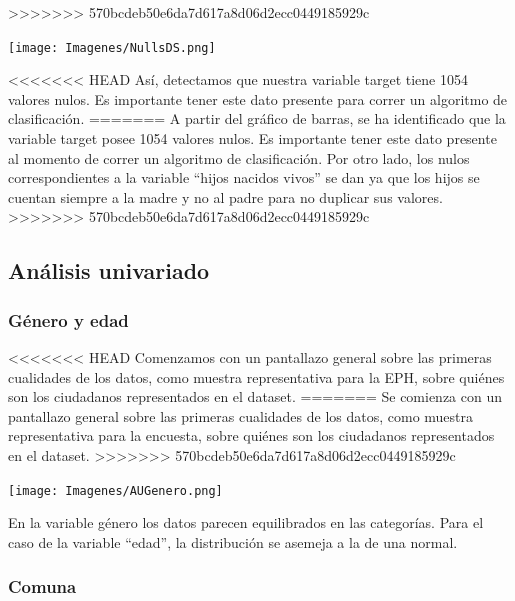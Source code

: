\documentclass[a4paper]{article}
\begin{document}
    \newpage
>>>>>>> 570bcdeb50e6da7d617a8d06d2ecc0449185929c

    \begin{center}
        \texttt{[image: Imagenes/NullsDS.png]}
    \end{center}
 
<<<<<<< HEAD
    Así, detectamos que nuestra variable target tiene 1054 valores nulos. Es importante tener este dato presente para correr un algoritmo de clasificación.
=======
    A partir del gráfico de barras, se ha identificado que la variable target posee 1054 valores nulos. Es importante tener este dato presente al momento de correr un algoritmo de clasificación. Por otro lado, los nulos correspondientes a la variable ``hijos nacidos vivos'' se dan ya que los hijos se cuentan siempre a la madre y no al padre para no duplicar sus valores.
>>>>>>> 570bcdeb50e6da7d617a8d06d2ecc0449185929c

    \subsection{Análisis univariado}
 
        \subsubsection{Género y edad}
           
<<<<<<< HEAD
            Comenzamos con un pantallazo general sobre las primeras cualidades de los datos, como muestra representativa para la EPH, sobre quiénes son los ciudadanos representados en el dataset.
=======
            Se comienza con un pantallazo general sobre las primeras cualidades de los datos, como muestra representativa para la encuesta, sobre quiénes son los ciudadanos representados en el dataset.
>>>>>>> 570bcdeb50e6da7d617a8d06d2ecc0449185929c
           
            \begin{center}
                \texttt{[image: Imagenes/AUGenero.png]}    
            \end{center}
           
 
            En la variable género los datos parecen equilibrados en las categorías. Para el caso de la variable ``edad'', la distribución se asemeja a la de una normal.
           
            \subsubsection{Comuna}
           
\end{document}
